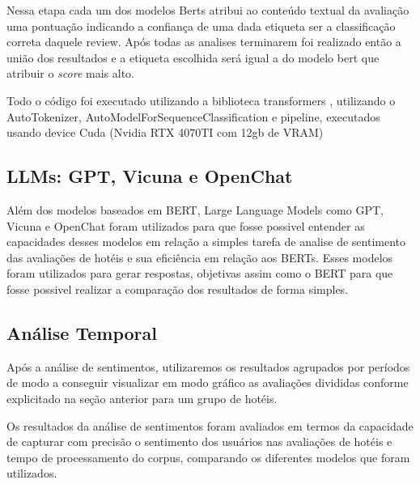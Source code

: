 Nessa etapa cada um dos modelos Berts atribui ao conteúdo textual da avaliação uma pontuação indicando a confiança de uma dada etiqueta ser a classificação correta daquele review. Após todas as analises terminarem foi realizado então a união dos resultados e a etiqueta escolhida será igual a do modelo bert que atribuir o \emph{score} mais alto.

Todo o código foi executado utilizando a biblioteca transformers \cite{Wolf_Transformers_State-of-the-Art_Natural_2020}, utilizando o AutoTokenizer, AutoModelForSequenceClassification e pipeline, executados usando device Cuda (Nvidia RTX 4070TI com 12gb de VRAM) %

\subsection{LLMs: GPT, Vicuna e OpenChat}
\label{subsec:analise_sentimentos:llms}

Além dos modelos baseados em BERT, Large Language Models como GPT, Vicuna e OpenChat foram utilizados para que fosse possivel entender as capacidades desses modelos em relação a simples tarefa de analise de sentimento das avaliações de hotéis e sua eficiência em relação aos BERTs. Esses modelos foram utilizados para gerar respostas, objetivas assim como o BERT para que fosse possivel realizar a comparação dos resultados de forma simples.





\subsection{Análise Temporal}
\label{subsec:analise_temporal}
Após a análise de sentimentos, utilizaremos os resultados agrupados por períodos de modo a conseguir visualizar em modo gráfico as avaliações divididas conforme explicitado na seção anterior para um grupo de hotéis.

\label{subsec:avaliacao_resultados}
Os resultados da análise de sentimentos foram avaliados em termos da capacidade de capturar com precisão o sentimento dos usuários nas avaliações de hotéis e tempo de processamento do corpus, comparando os diferentes modelos que foram utilizados.
